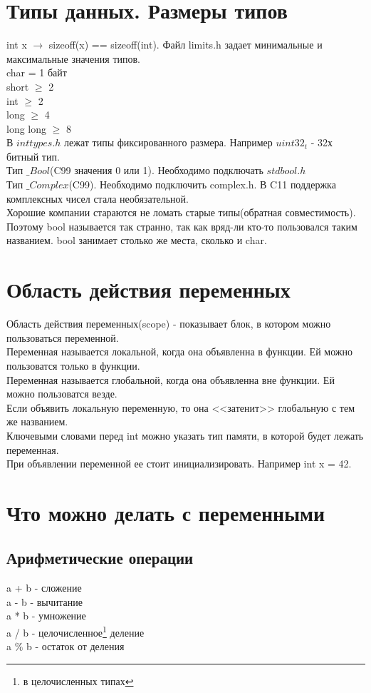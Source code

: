 \documentclass[a4paper,12pt]{article}
\author{конспект от TheLostDesu}
\title{}
\date{\today}
\begin{document}
\maketitle
\section{Типы данных. Размеры типов}
int x $\rightarrow $ sizeoff(x) == sizeoff(int).
Файл limits.h задает минимальные и максимальные значения типов.\\
char = 1 байт\\
short $\geq$ 2\\
int $\geq$ 2\\
long $\geq$ 4\\
long long $\geq$ 8\\
В $inttypes.h$ лежат типы фиксированного размера. Например $uint32_t$ - 32х битный тип.\\
Тип $\_Bool$(C99 значения 0 или 1). Необходимо подключать $stdbool.h$\\
Тип $\_Complex$(C99). Необходимо подключить complex.h. В C11  поддержка комплексных чисел стала необязательной.\\
Хорошие компании стараются не ломать старые типы(обратная совместимость). Поэтому bool называется так странно, так как вряд-ли кто-то пользовался таким названием. bool занимает столько же места, сколько и char.
\section{Область действия переменных}
Область действия переменных(scope) - показывает блок, в котором можно пользоваться переменной.\\
Переменная называется локальной, когда она объявленна в функции. Ей можно пользоватся только в функции.\\
Переменная называется глобальной, когда она объявленна вне функции. Ей можно пользоватся везде. \\
Если объявить локальную переменную, то она <<затенит>> глобальную с тем же названием.\\
Ключевыми словами перед int можно указать тип памяти, в которой будет лежать переменная. \\
При объявлении переменной ее стоит инициализировать. Например int x = 42.
\section{Что можно делать с переменными}
\subsection{Арифметические операции}
a + b - сложение\\
a - b - вычитание\\
a * b - умножение\\
a / b - $целочисленное$\footnote{в целочисленных типах} деление\\
a $\%$ b - остаток от деления 
\end{document}
